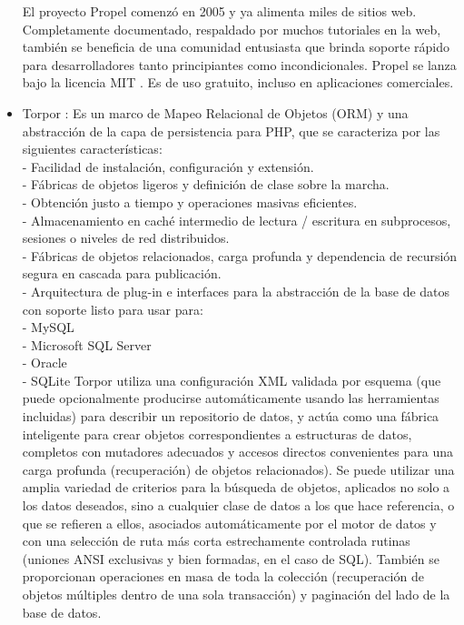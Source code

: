 \documentclass[%
 reprint,
 amsmath,amssymb,
 aps,
]{revtex4-1}
\begin{document}
\begin{itemize}
El proyecto Propel comenzó en 2005 y ya alimenta miles de sitios web. Completamente documentado, respaldado por muchos tutoriales en la web, también se beneficia de una comunidad entusiasta que brinda soporte rápido para desarrolladores tanto principiantes como incondicionales. Propel se lanza bajo la licencia MIT . Es de uso gratuito, incluso en aplicaciones comerciales.\cite{propel}\\
	\item Torpor : Es un marco de Mapeo Relacional de Objetos (ORM) y una abstracción de la capa de persistencia para PHP, que se caracteriza por las siguientes características:\\
- Facilidad de instalación, configuración y extensión.\\
- Fábricas de objetos ligeros y definición de clase sobre la marcha.\\
- Obtención justo a tiempo y operaciones masivas eficientes.\\
- Almacenamiento en caché intermedio de lectura / escritura en subprocesos, sesiones o niveles de red distribuidos.\\
- Fábricas de objetos relacionados, carga profunda y dependencia de recursión segura en cascada para publicación.\\
- Arquitectura de plug-in e interfaces para la abstracción de la base de datos con soporte listo para usar para:\\
   - MySQL\\
   - Microsoft SQL Server\\
   - Oracle\\
   - SQLite
	Torpor utiliza una configuración XML validada por esquema (que puede opcionalmente producirse automáticamente usando las herramientas incluidas) para describir un repositorio de datos, y actúa como una fábrica inteligente para crear objetos correspondientes a estructuras de datos, completos con mutadores adecuados y accesos directos convenientes para una carga profunda (recuperación) de objetos relacionados). Se puede utilizar una amplia variedad de criterios para la búsqueda de objetos, aplicados no solo a los datos deseados, sino a cualquier clase de datos a los que hace referencia, o que se refieren a ellos, asociados automáticamente por el motor de datos y con una selección de ruta más corta estrechamente controlada rutinas (uniones ANSI exclusivas y bien formadas, en el caso de SQL). También se proporcionan operaciones en masa de toda la colección (recuperación de objetos múltiples dentro de una sola transacción) y paginación del lado de la base de datos.\cite{torpor}\\
\end{itemize}
\end{document}
